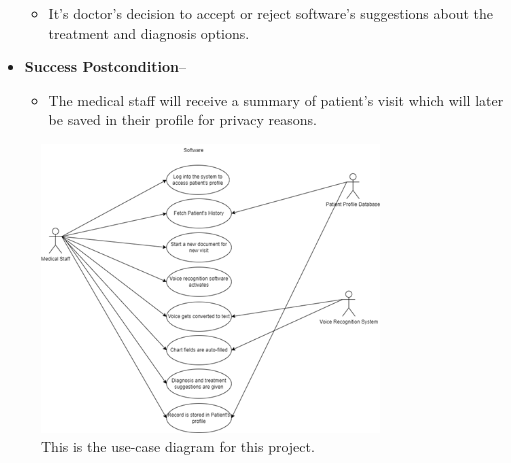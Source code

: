 \documentclass[12pt]{article}
\begin{document}
\begin{itemize}
\begin{itemize}[label=5.\arabic*]
  \end{itemize}
  \begin{itemize}[label=6.\arabic*]
    \item{It's doctor’s decision to accept or reject software’s suggestions about the treatment and diagnosis options.}
  \end{itemize}
  \item\textbf{Success Postcondition}--
  \begin{itemize}
    \item{The medical staff will receive a summary of patient’s visit which will later be saved in their profile for privacy reasons.}
  \end{itemize}
\end{itemize}

\begin{figure}[h]
  \centering
  \includegraphics[width=0.8\textwidth]{use_case_diag.png}
  \caption{This is the use-case diagram for this project.}
  \label{fig:Use-Case Diagram}
\end{figure}
\end{document}
